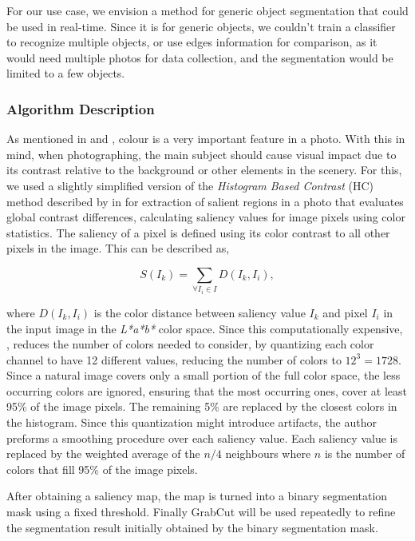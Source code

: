 For our use case, we envision a method for generic object segmentation that could be used in real-time. Since it is for generic objects, we couldn't train a classifier to recognize multiple objects, or use edges information for comparison, as it would need multiple photos for data collection, and the segmentation would be limited to a few objects. 

\subsubsection{Algorithm Description}
\label{subsub:seg_algorithm}

As mentioned in \cite{Santos} and \cite{kamps2012rules}, colour is a very important feature in a photo. With this in mind, when photographing, the main subject should cause visual impact due to its contrast relative to the background or other elements in the scenery. For this, we used a slightly simplified version of the \emph{Histogram Based Contrast} (HC) method described by \citeauthor{cheng2011global} in \cite{cheng2011global} for extraction of salient regions in a photo that evaluates global contrast differences, calculating saliency values for image pixels using color statistics. The saliency of a pixel is defined using its color contrast to all other pixels in the image. This can be described as,

\begin{equation}
S(I_{k}) = \sum_{\forall I_{i} \in I} D(I_{k}, I_{i}),
\end{equation}

where $D(I_{k}, I_{i})$ is the color distance between saliency value $I_{k}$ and pixel $I_{i}$ in the input image in the \emph{L*a*b*} color space. Since this computationally expensive, \citeauthor{cheng2011global}, reduces the number of colors needed to consider, by quantizing each color channel to have 12 different values, reducing the number of colors to $12^{3} = 1728$. Since a natural image covers only a small portion of the full color space, the less occurring colors are ignored, ensuring that the most occurring ones, cover at least 95\% of the image pixels. The remaining 5\% are replaced by the closest colors in the histogram. Since this quantization might introduce artifacts, the author preforms a smoothing procedure over each saliency value. Each saliency value is replaced by the weighted average of the $n/4$ neighbours where $n$ is the number of colors that fill 95\% of the image pixels.

After obtaining a saliency map, the map is turned into a binary segmentation mask using a fixed threshold. Finally GrabCut\cite{rother2004grabcut} will be used repeatedly to refine the segmentation result initially obtained by the binary segmentation mask.

